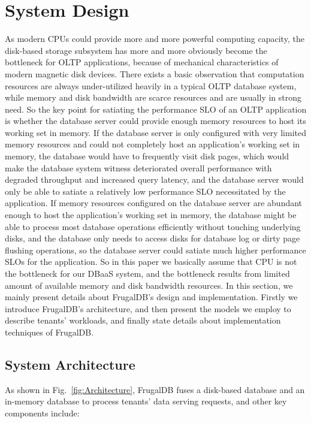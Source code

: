 \section{System Design}\label{sec:SDI}

As modern CPUs could provide more and more powerful computing capacity, the disk-based storage subsystem has more and more obviously become the bottleneck for OLTP applications, because of mechanical characteristics of modern magnetic disk devices. There exists a basic observation that computation resources are always under-utilized heavily in a typical OLTP database system, while memory and disk bandwidth are scarce resources and are usually in strong need. So the key point for satiating the performance SLO of an OLTP application is whether the database server could provide enough memory resources to host its working set in memory. If the database server is only configured with very limited memory resources and could not completely host an application's working set in memory, the database would have to frequently visit disk pages, which would make the database system witness deteriorated overall performance with degraded throughput and increased query latency, and the database server would only be able to satiate a relatively low performance SLO necessitated by the application. If memory resources configured on the database server are abundant enough to host the application's working set in memory, the database might be able to process most database operations efficiently without touching underlying disks, and the database only needs to access disks for database log or dirty page flushing operations, so the database server could satiate much higher performance SLOs for the application. So in this paper we basically assume that CPU is not the bottleneck for our DBaaS system, and the bottleneck results from limited amount of available memory and disk bandwidth resources. In this section, we mainly present details about FrugalDB's design and implementation. Firstly we introduce FrugalDB's architecture, and then present the models we employ to describe tenants' workloads, and finally state details about implementation techniques of FrugalDB.

\subsection{System Architecture}\label{sec:Overview}

As shown in Fig.~\ref{fig:Architecture}, FrugalDB fuses a disk-based database and an in-memory database to process tenants' data serving requests, and other key components include:

